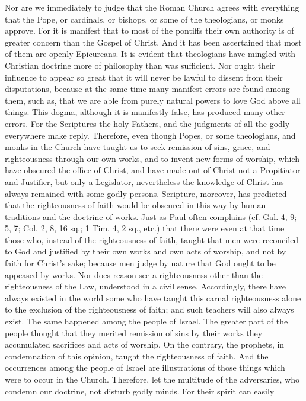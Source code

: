 Nor are we immediately to judge that the Roman Church agrees with
everything that the Pope, or cardinals, or bishops, or some of the
theologians, or monks approve.  For it is manifest that to most of
the pontiffs their own authority is of greater concern than the
Gospel of Christ.  And it has been ascertained that most of them are
openly Epicureans.  It is evident that theologians have mingled with
Christian doctrine more of philosophy than was sufficient.  Nor ought
their influence to appear so great that it will never be lawful to
dissent from their disputations, because at the same time many
manifest errors are found among them, such as, that we are able from
purely natural powers to love God above all things.  This dogma,
although it is manifestly false, has produced many other errors.  For
the Scriptures the holy Fathers, and the judgments of all the godly
everywhere make reply.  Therefore, even though Popes, or some
theologians, and monks in the Church have taught us to seek remission
of sins, grace, and righteousness through our own works, and to
invent new forms of worship, which have obscured the office of Christ,
and have made out of Christ not a Propitiator and Justifier, but
only a Legislator, nevertheless the knowledge of Christ has always
remained with some godly persons.  Scripture, moreover, has predicted
that the righteousness of faith would be obscured in this way by
human traditions and the doctrine of works.  Just as Paul often
complains (cf.  Gal. 4, 9; 5, 7; Col. 2, 8, 16 sq.; 1 Tim. 4, 2 sq.,
etc.) that there were even at that time those who, instead of the
righteousness of faith, taught that men were reconciled to God and
justified by their own works and own acts of worship, and not by
faith for Christ's sake; because men judge by nature that God ought
to be appeased by works.  Nor does reason see a righteousness other
than the righteousness of the Law, understood in a civil sense.
Accordingly, there have always existed in the world some who have
taught this carnal righteousness alone to the exclusion of the
righteousness of faith; and such teachers will also always exist.
The same happened among the people of Israel.  The greater part of
the people thought that they merited remission of sins by their works
they accumulated sacrifices and acts of worship.  On the contrary,
the prophets, in condemnation of this opinion, taught the
righteousness of faith.  And the occurrences among the people of
Israel are illustrations of those things which were to occur in the
Church.  Therefore, let the multitude of the adversaries, who condemn
our doctrine, not disturb godly minds.  For their spirit can easily
